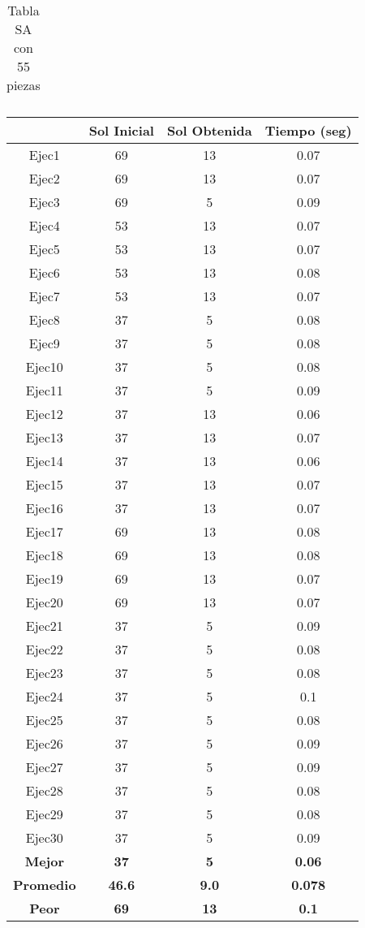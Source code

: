 \begin{center}
\begin{table}
\begin{tabular}{|c|c|c|c|}
\end{tabular}
\caption{Tabla SA con 55 piezas}
\end{table}

\begin{table}

\begin{tabular}{|c|c|c|c|}

\hline
 & {\bf Sol Inicial} & {\bf Sol Obtenida} & {\bf Tiempo (seg)} \\
\hline
Ejec1 & 69 & 13  & 0.07 \\
\hline
Ejec2 & 69 & 13  & 0.07 \\
\hline
Ejec3 & 69 & 5  & 0.09 \\
\hline
Ejec4 & 53 & 13  & 0.07 \\
\hline
Ejec5 & 53 & 13  & 0.07 \\
\hline
Ejec6 & 53 & 13  & 0.08 \\
\hline
Ejec7 & 53 & 13  & 0.07 \\
\hline
Ejec8 & 37 & 5  & 0.08 \\
\hline
Ejec9 & 37 & 5  & 0.08 \\
\hline
Ejec10 & 37 & 5  & 0.08 \\
\hline
Ejec11 & 37 & 5  & 0.09 \\
\hline
Ejec12 & 37 & 13  & 0.06 \\
\hline
Ejec13 & 37 & 13  & 0.07 \\
\hline
Ejec14 & 37 & 13  & 0.06 \\
\hline
Ejec15 & 37 & 13  & 0.07 \\
\hline
Ejec16 & 37 & 13  & 0.07 \\
\hline
Ejec17 & 69 & 13  & 0.08 \\
\hline
Ejec18 & 69 & 13  & 0.08 \\
\hline
Ejec19 & 69 & 13  & 0.07 \\
\hline
Ejec20 & 69 & 13  & 0.07 \\
\hline
Ejec21 & 37 & 5  & 0.09 \\
\hline
Ejec22 & 37 & 5  & 0.08 \\
\hline
Ejec23 & 37 & 5  & 0.08 \\
\hline
Ejec24 & 37 & 5  & 0.1 \\
\hline
Ejec25 & 37 & 5  & 0.08 \\
\hline
Ejec26 & 37 & 5  & 0.09 \\
\hline
Ejec27 & 37 & 5  & 0.09 \\
\hline
Ejec28 & 37 & 5  & 0.08 \\
\hline
Ejec29 & 37 & 5  & 0.08 \\
\hline
Ejec30 & 37 & 5  & 0.09 \\
\hline
{\bf Mejor} & {\bf 37} & {\bf 5} & {\bf 0.06} \\
\hline
{\bf Promedio} & {\bf 46.6} & {\bf 9.0} & {\bf 0.078} \\
\hline
{\bf Peor} & {\bf 69} & {\bf 13} & {\bf 0.1} \\
\hline


\end{tabular}
\end{table}
\end{center}
